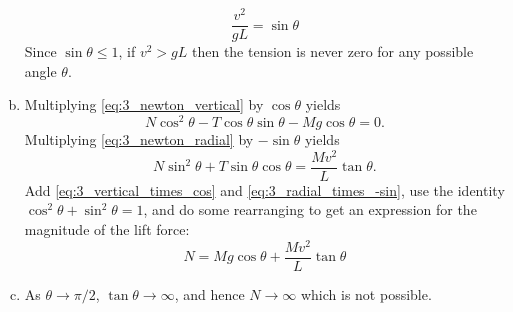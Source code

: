 \documentclass{esg8012exam}
\begin{document}
\begin{solution}
\begin{enumerate}[(a)]
      \begin{equation}
        \frac{v^2}{g L} = \sin\theta
      \end{equation}
      Since $\sin\theta \le 1$, if $v^2 > gL$ then the tension is never zero for any possible angle $\theta$.
    \item Multiplying \autoref{eq:3_newton_vertical} by $\cos\theta$ yields
      \begin{equation}
        N \cos^2\theta - T\cos\theta\sin\theta - M g \cos\theta = 0. \label{eq:3_vertical_times_cos}
      \end{equation}
      Multiplying \autoref{eq:3_newton_radial} by $-\sin\theta$ yields
      \begin{equation}
        N \sin^2\theta + T\sin\theta\cos\theta = \frac{M v^2}{L}\tan\theta. \label{eq:3_radial_times_-sin}
      \end{equation}
      Add \autoref{eq:3_vertical_times_cos} and \autoref{eq:3_radial_times_-sin}, use the identity $\cos^2\theta + \sin^2\theta = 1$, and do some rearranging to get an expression for the magnitude of the lift force:
      \begin{equation}
        N = M g \cos\theta + \frac{M v^2}{L} \tan\theta
      \end{equation}
    \item As $\theta \to \pi / 2$, $\tan\theta \to \infty$, and hence $N \to \infty$ which is not possible.
  \end{enumerate}
\end{solution}
\end{document}
